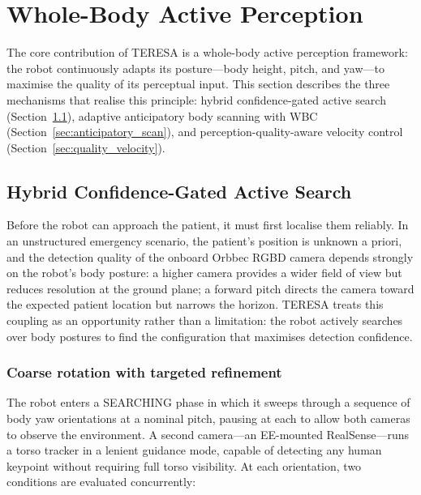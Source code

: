 \section{Whole-Body Active Perception}
\label{sec:active_perception}

The core contribution of \ac{TERESA} is a whole-body active perception
framework: the robot continuously adapts its posture---body height, pitch,
and yaw---to maximise the quality of its perceptual input. This section
describes the three mechanisms that realise this principle:
hybrid confidence-gated active search
(Section~\ref{sec:confidence_search}),
adaptive anticipatory body scanning with \ac{WBC}
(Section~\ref{sec:anticipatory_scan}),
and perception-quality-aware velocity control
(Section~\ref{sec:quality_velocity}).

\subsection{Hybrid Confidence-Gated Active Search}
\label{sec:confidence_search}

Before the robot can approach the patient, it must first localise them
reliably. In an unstructured emergency scenario, the patient's position is
unknown a priori, and the detection quality of the onboard Orbbec \ac{RGBD}
camera depends strongly on the robot's body posture: a higher camera provides
a wider field of view but reduces resolution at the ground plane; a forward
pitch directs the camera toward the expected patient location but narrows the
horizon. \ac{TERESA} treats this coupling as an opportunity rather than a
limitation: the robot actively searches over body postures to find the
configuration that maximises detection confidence.

\subsubsection{Coarse rotation with targeted refinement}

The robot enters a SEARCHING phase in which it sweeps through a sequence of
body yaw orientations at a nominal pitch, pausing at each to allow both
cameras to observe the environment. A second camera---an \ac{EE}-mounted
RealSense---runs a torso tracker in a lenient guidance mode, capable of
detecting any human keypoint without requiring full torso visibility. At
each orientation, two conditions are evaluated concurrently:

